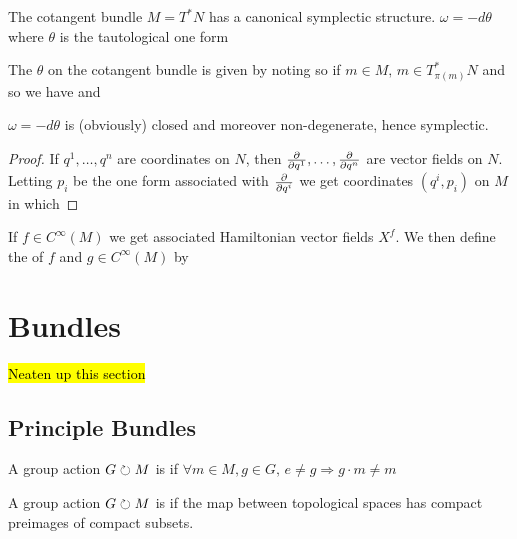 \documentclass{article}
\begin{document}
\begin{theorem}
The cotangent bundle $M= T^\ast N$ has a canonical symplectic structure. $\omega = - d\theta$ where $\theta$ is the tautological one form 
\end{theorem}

\begin{definition}
The  $\theta$ on the cotangent bundle is given by noting 
so if $ m \in M, \, m \in T_{\pi(m)}^\ast N$ and so we have 
and 
\end{definition}

\begin{lemma}
$\omega = -d\theta$ is (obviously) closed and moreover non-degenerate, hence symplectic. 
\end{lemma}
\begin{proof}
If $q^1, \dots, q^n$ are coordinates on $N$, then $\frac{\partial}{\partial q^1}, \dots, \frac{\partial}{\partial q^n}$ are vector fields on $N$. Letting $p_i$ be the one form associated with $\frac{\partial}{\partial q^i}$ we get coordinates $(q^i,p_i)$ on $M$ in which 
\end{proof}

\begin{aside}
If $f \in C^\infty(M)$ we get associated Hamiltonian vector fields $X^f$. We then define the  of $f$ and $g \in C^\infty(M)$ by 
\end{aside}
\section{Bundles}
\hl{Neaten up this section}
\subsection{Principle Bundles}
\begin{definition}
A group action $G \circlearrowright M$ is  if $\forall m \in M, g \in G, \, e \neq g \Rightarrow g\cdot m \neq m$
\end{definition}

\begin{definition}
A group action $G \circlearrowright M$ is  if the map between topological spaces 
has compact preimages of compact subsets. 
\end{definition}
\end{document}
